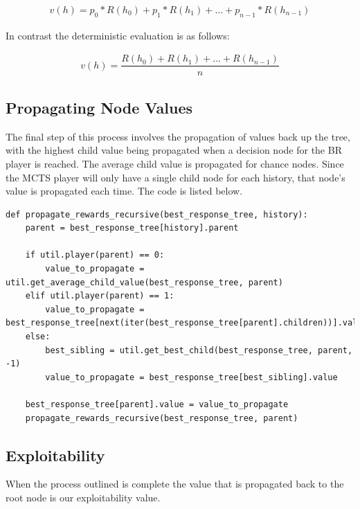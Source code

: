 \begin{align}
    v(h) = p_0*R(h_0) + p_1*R(h_1) + \dots + p_{n-1}*R(h_{n-1})
\end{align}

In contrast the deterministic evaluation is as follows:

\begin{align}
    v(h) = \dfrac{R(h_0) + R(h_1) + \dots + R(h_{n-1})}{n}
\end{align}

\subsection{Propagating Node Values}\label{subsec:propagateTerminals}
The final step of this process involves the propagation of values back up the tree, with the highest
child value being propagated when a decision node for the BR player is reached.
The average child value is propagated for chance nodes.
Since the MCTS player will only have a single child node for each history, that node's value is
propagated each time.
The code is listed below.

\begin{lstlisting}[style=Python]
def propagate_rewards_recursive(best_response_tree, history):
    parent = best_response_tree[history].parent

    if util.player(parent) == 0:
        value_to_propagate = util.get_average_child_value(best_response_tree, parent)
    elif util.player(parent) == 1:
        value_to_propagate = best_response_tree[next(iter(best_response_tree[parent].children))].value
    else:
        best_sibling = util.get_best_child(best_response_tree, parent, -1)
        value_to_propagate = best_response_tree[best_sibling].value

    best_response_tree[parent].value = value_to_propagate
    propagate_rewards_recursive(best_response_tree, parent)
\end{lstlisting}

\subsection{Exploitability}\label{subsec:exploitability}
When the process outlined is complete the value that is propagated back to the
root node is our exploitability value.

